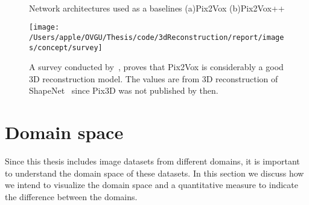 %


\begin{figure}[!ht]
    \centering
    \quad
    \\
    \caption{Network architectures used as a baselines (a)Pix2Vox (b)Pix2Vox++}
    \label{fig:architectures}
\end{figure}

\begin{figure}
    \centering
    \texttt{[image: /Users/apple/OVGU/Thesis/code/3dReconstruction/report/images/concept/survey]}
    \caption{A survey conducted by~\cite{Han2021ImageBased3O}, proves that Pix2Vox is considerably a good 3D reconstruction model.
    The values are from 3D reconstruction of ShapeNet~\cite{chang2015shapenet} since Pix3D was not published by then.}
    \label{fig:survey on 3d reconstruction}
\end{figure}


\section{Domain space}\label{sec:domain-space}

Since this thesis includes image datasets from different domains, it is important to understand the domain space of these datasets.
In this section we discuss how we intend to visualize the domain space and a quantitative measure to indicate the difference between the domains.


